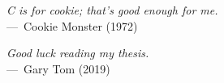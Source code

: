 \vspace*{\fill}

\begin{epigraph}
    \emph{C is for cookie; that's good enough for me.} \\---~Cookie Monster (1972)
\end{epigraph}

\begin{epigraph}
    \emph{Good luck reading my thesis.} \\---~Gary Tom (2019)
\end{epigraph}

\vspace*{\fill}

